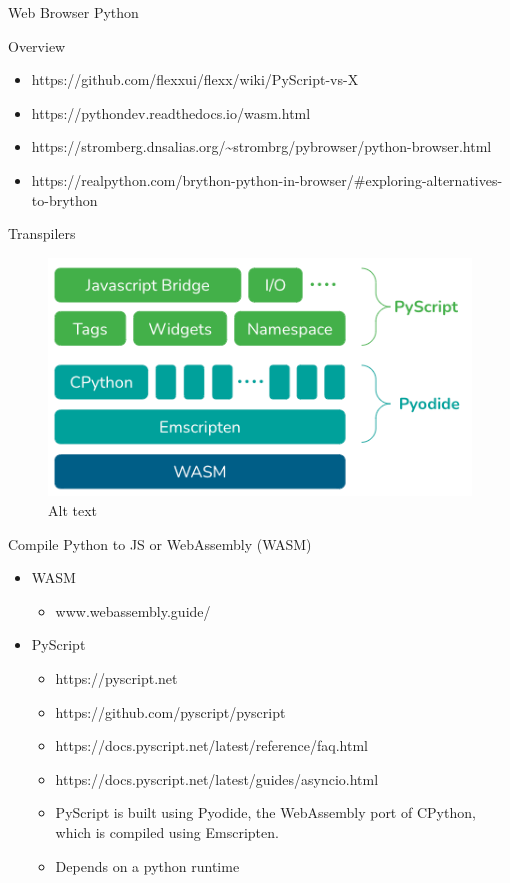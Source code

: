 \label{notes__03100-python.md}
\begin{block}{Web Browser Python}
\label{notes__03100-python.md__web-browser-python}
\begin{block}{Overview}
\label{notes__03100-python.md__overview}
\begin{itemize}
\tightlist
\item
  https://github.com/flexxui/flexx/wiki/PyScript-vs-X
\item
  https://pythondev.readthedocs.io/wasm.html
\item
  https://stromberg.dnsalias.org/\textasciitilde strombrg/pybrowser/python-browser.html
\item
  https://realpython.com/brython-python-in-browser/\#exploring-alternatives-to-brython
\end{itemize}
\end{block}

\begin{block}{Transpilers}
\label{notes__03100-python.md__transpilers}
\begin{figure}
\centering
\includegraphics{notes/../figures/pyodide-pyscript.png}
\caption{Alt text}
\end{figure}

Compile Python to JS or WebAssembly (WASM)

\begin{itemize}
\item
  WASM

  \begin{itemize}
  \tightlist
  \item
    www.webassembly.guide/
  \end{itemize}
\item
  PyScript

  \begin{itemize}
  \tightlist
  \item
    https://pyscript.net
  \item
    https://github.com/pyscript/pyscript
  \item
    https://docs.pyscript.net/latest/reference/faq.html
  \item
    https://docs.pyscript.net/latest/guides/asyncio.html
  \item
    PyScript is built using Pyodide, the WebAssembly port of CPython, which is compiled using Emscripten.
  \item
    Depends on a python runtime


\end{itemize}
\end{itemize}
\end{block}
\end{block}
